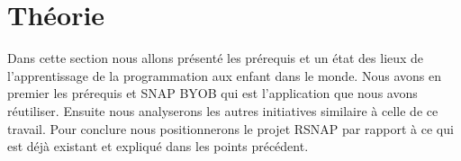 \chapter{Théorie}
Dans cette section nous allons présenté les prérequis et un état des lieux de l'apprentissage de la programmation aux enfant dans le monde. Nous avons en premier les prérequis et SNAP BYOB qui est l'application que nous avons réutiliser. Ensuite nous analyserons les autres initiatives similaire à celle de ce travail. Pour conclure nous positionnerons le projet RSNAP par rapport à ce qui est déjà existant et expliqué dans les points précédent.





